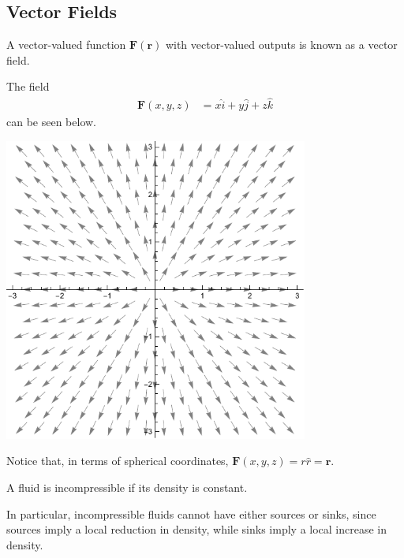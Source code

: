 \documentclass[10pt]{mypackage}
\begin{document}
\subsection{Vector Fields}%
\begin{definition}
  A vector-valued function $\mathbf{F}\left(\mathbf{r}\right)$ with vector-valued outputs is known as a vector field.
\end{definition}
\begin{example}
  The field
  \begin{align*}
  \mathbf{F}\left(x,y,z\right) &= x\hat{i} + y\hat{j} + z\hat{k}
  \end{align*}
  can be seen below.
  \begin{center}
    \includegraphics[width=10cm]{images/xyz_vector_field.pdf}
  \end{center}
  Notice that, in terms of spherical coordinates, $\mathbf{F}\left(x,y,z\right) = r\hat{r} = \mathbf{r}$.
\end{example}
\begin{definition}
  A fluid is incompressible if its density is constant.\newline

  In particular, incompressible fluids cannot have either sources or sinks, since sources imply a local reduction in density, while sinks imply a local increase in density.
\end{definition}
\end{document}
